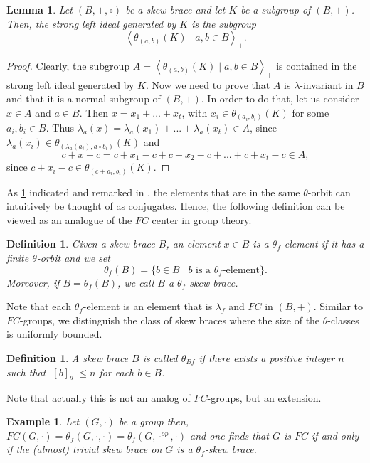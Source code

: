 \documentclass{amsart}
\newtheorem{lem}[thm]{Lemma}
\newtheorem{defn}[thm]{Definition}
\newtheorem{exa}[thm]{Example}
\begin{document}
\begin{lem}\label{leftidealgenerated}
    Let $(B,+,\circ)$ be a skew brace and let $K$ be a subgroup of $(B,+)$. Then, the strong left ideal generated by $K$ is the subgroup $$\left<\theta_{(a,b)}(K) \mid a,b\in B\right>_+.$$
\end{lem}
\begin{proof}
    Clearly, the subgroup $A=\left<\theta_{(a,b)}(K) \mid a,b\in B\right>_+$ is contained in the strong left ideal generated by $K$. Now we need to prove that $A$ is $\lambda$-invariant in $B$ and that it is a normal subgroup of $(B,+)$. In order to do that, let us consider $x\in A$ and $a\in B$. Then $x=x_1+...+x_t$, with $x_i\in\theta_{(a_i,b_i)}(K)$ for some $a_i,b_i\in B$. Thus $\lambda_a(x)=\lambda_a(x_1)+...+\lambda_a(x_t)\in A$, since $\lambda_a(x_i)\in \theta_{(\lambda_a(a_i),a\circ b_i)}(K)$ and 
    \[
    c+x-c=c+x_1-c+c+x_2-c+...+c+x_t-c\in A,
    \]
    since $c+x_i-c\in \theta_{(c+a_i,b_i)}(K)$.
\end{proof}

As \cref{leftidealgenerated} indicated and remarked in \cite{conju}, the elements that are in the same $\theta$-orbit can intuitively be thought of as conjugates. Hence, the following definition can be viewed as an analogue of the $FC$ center in group theory.

\begin{defn}
    Given a skew brace $B$, an element $x\in B$ is a \emph{$\theta_f$-element} if it has a finite $\theta$-orbit and we set
\[
\theta_f(B)=\{b\in B\mid b \text{ is a }\theta_f\text{-element}\}.
\] 
Moreover, if $B=\theta_f(B)$, we call $B$ a \emph{$\theta_f$-skew brace}.
\end{defn}
 Note that each $\theta_f$-element is an element that is $\lambda_f$ and $FC$ in $(B,+)$. Similar to $FC$-groups, we distinguish the class of skew braces where the size of the $\theta$-classes is uniformly bounded.
 
\begin{defn}
    A skew brace $B$ is called 
    $\theta_{Bf}$ if there exists a 
    positive integer $n$ such that
    $|[b]_\theta|\leq n$ for each $b\in B$.
\end{defn}

Note that actually this is not an analog of $FC$-groups, but an extension. 

\begin{exa}
    
Let $(G,\cdot)$ be a group then, $FC(G,\cdot)=\theta_f(G,\cdot,\cdot)=\theta_f(G,\cdot^{op},\cdot)$ and one finds that $G$ is $FC$ if and only if the (almost) trivial skew brace on $G$ is a $\theta_f$-skew brace.
\end{exa}
\end{document}

